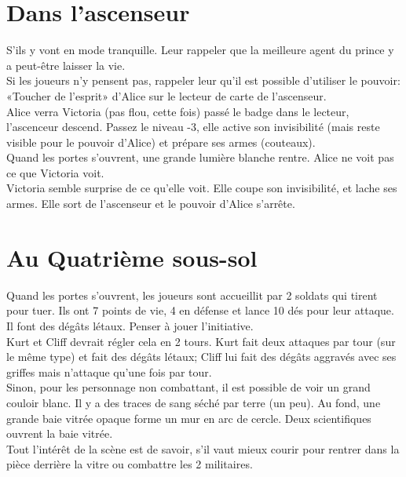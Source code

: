 \documentclass[oneside,12pt]{book}
\begin{document}
\begin{flushleft}
\section{Dans l'ascenseur}
S'ils y vont en mode tranquille. Leur rappeler que la meilleure agent du prince y a peut-être laisser la vie. \\
Si les joueurs n'y pensent pas, rappeler leur qu'il est possible d'utiliser le pouvoir: «Toucher de l'esprit» d'Alice sur le lecteur de carte de l'ascenseur.\\
Alice verra Victoria (pas flou, cette fois) passé le badge dans le lecteur, l'ascenceur descend. Passez le niveau -3, elle active son invisibilité (mais reste visible pour le pouvoir d'Alice) et prépare ses armes (couteaux).\\
Quand les portes s'ouvrent, une grande lumière blanche rentre. Alice ne voit pas ce que Victoria voit. \\
Victoria semble surprise de ce qu'elle voit. Elle coupe son invisibilité, et lache ses armes. Elle sort de l'ascenseur et le pouvoir d'Alice s'arrête.\\

\section{Au Quatrième sous-sol}
Quand les portes s'ouvrent, les joueurs sont accueillit par 2 soldats qui tirent pour tuer.
Ils ont 7 points de vie, 4 en défense et lance 10 dés pour leur attaque. Il font des dégâts létaux. Penser à jouer l'initiative. \\
Kurt et Cliff devrait régler cela en 2 tours. Kurt fait deux attaques par tour (sur le même type) et fait des dégâts létaux; Cliff lui fait des dégâts aggravés avec ses griffes mais n'attaque qu'une fois par tour.\\


\vspace{0.5cm}
Sinon, pour les personnage non combattant, il est possible de voir un grand couloir blanc. Il y a des traces de sang séché par terre (un peu). Au fond, une grande baie vitrée opaque forme un mur en arc de cercle. Deux scientifiques ouvrent la baie vitrée.\\


\vspace{0.5cm}
Tout l'intérêt de la scène est de savoir, s'il vaut mieux courir pour rentrer dans la pièce derrière la vitre ou combattre les 2 militaires.\\



\end{flushleft}
\end{document}
